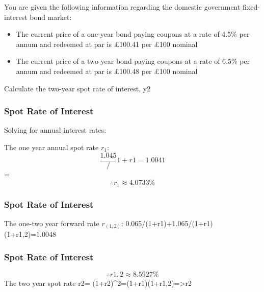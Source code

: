 
\begin{frame}
You are given the following information regarding the domestic government fixed-interest bond market:

\begin{itemize}
\item The current price of a one-year bond paying coupons at a rate of 4.5\% per annum and redeemed at par is £100.41 per £100 nominal
\item The current price of a two-year bond paying coupons at a rate of 6.5\% per annum and redeemed at par is £100.48 per £100 nominal
\end{itemize}

Calculate the two-year spot rate of interest, y2

\end{frame}
\begin{frame}
\frametitle{Spot Rate of Interest}
\Large

Solving for annual interest rates:

The one year annual spot rate $r_1$:
\[ \frac{1.045}/{1+r1}=1.0041\] =
\[ \therefore r_1 \approx 4.0733\%\]

\end{frame}
\begin{frame}
\frametitle{Spot Rate of Interest}
\Large


The one-two year forward rate $r_{(1,2)}$:
0.065/(1+r1)+1.065/(1+r1)(1+r1,2)=1.0048

\end{frame}
\begin{frame}
\frametitle{Spot Rate of Interest}
\Large

\[ \therefore r1,2 \approx 8.5927 \%\]
The two year spot rate r2=
(1+r2)^2=(1+r1)(1+r1,2)=>r2 %
\end{frame}

